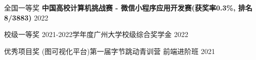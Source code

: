 

\begin{cvhonors}

    \cvhonor
    {全国一等奖} %
    {\textbf{中国高校计算机挑战赛 - 微信小程序应用开发赛(获奖率0.3\%, 排名8/3883)}} %
    {} %
    {2022} %

    \cvhonor
    {校级一等奖} %
    {2021-2022学年度广州大学校级综合奖学金} %
    {} %
    {2022} %

    \cvhonor
    {优秀项目奖} %
    {(图可视化平台)第一届字节跳动青训营 前端进阶班} %
    {} %
    {2021} %


\end{cvhonors}
